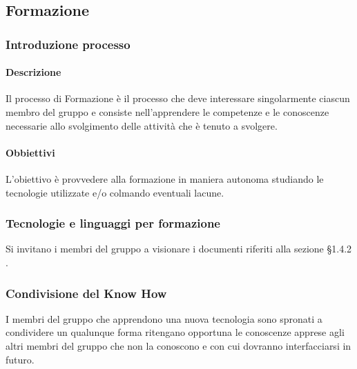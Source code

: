     \subsection{Formazione}
        \subsubsection{Introduzione processo}
            \paragraph{Descrizione}
                Il processo di Formazione è il processo che deve interessare singolarmente ciascun membro del gruppo e consiste nell’apprendere le competenze e le conoscenze necessarie allo svolgimento delle attività che è tenuto a svolgere.
            \paragraph{Obbiettivi}
                L'obiettivo è provvedere alla formazione in maniera autonoma studiando le tecnologie utilizzate e/o colmando eventuali lacune.
        \subsubsection{Tecnologie e linguaggi per formazione}
            Si invitano i membri del gruppo a visionare i documenti riferiti alla sezione §1.4.2 .
        \subsubsection{Condivisione del Know How}
            I membri del gruppo che apprendono una nuova tecnologia sono spronati a condividere un qualunque forma ritengano opportuna le conoscenze apprese agli altri membri del gruppo che non la conoscono e con cui dovranno interfacciarsi in futuro.




            
            
            
            
            
            
            
            
            
            
            
            
            
            
            
            